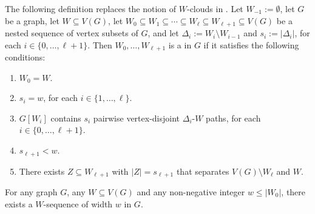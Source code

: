 \documentclass{patmorin}
\begin{document}
The following definition replaces the notion of $W$-clouds in \cite{dvorak.norin:treewidth}.
Let $W_{-1}:=\emptyset$, let $G$ be a graph, let $W\subseteq V(G)$, let $W_0\subseteq W_1\subseteq\cdots\subseteq W_{\ell}\subseteq W_{\ell+1}\subseteq V(G)$ be a nested sequence of vertex subsets of $G$, and let $\Delta_i:=W_{i}\setminus W_{i-1}$ and $s_i:=|\Delta_i|$, for each $i\in\{0,\ldots,\ell+1\}$.  Then $W_0,\ldots,W_{\ell+1}$ is a  in $G$ if it satisfies the following conditions:
\begin{enumerate}[nosep,nolistsep,label=\rm(\alph*),ref=(\alph*)]
  \item $W_0=W$.\label{w_starts}
  \item $s_i=w$, for each $i\in\{1,\ldots,\ell\}$.\label{uniform_size}
  \item $G[W_i]$ contains $s_i$  pairwise vertex-disjoint $\Delta_i$-$W$ paths, for each $i\in\{0,\ldots,\ell+1\}$.\label{linked}
  \item $s_{\ell+1}< w$.\label{remainder}
  \item There exists $Z\subseteq W_{\ell+1}$ with $|Z|=s_{\ell+1}$ that separates $V(G)\setminus W_{\ell}$ and $W$. \label{separated}
\end{enumerate}

\begin{lem}\label{w_sequence}
  For any graph $G$, any $W\subseteq V(G)$ and any non-negative integer $w\le |W_0|$, there exists a $W$-sequence of width $w$ in $G$.
\end{lem}
\end{document}
